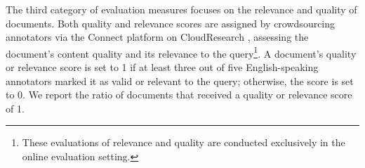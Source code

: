  The third category of evaluation measures focuses on the relevance and quality of documents. Both quality and relevance scores are assigned by crowdsourcing annotators via the Connect platform on CloudResearch \cite{noauthor_introducing_2024}, assessing the document's content quality and its relevance to the query\footnote{These evaluations of relevance and quality are conducted exclusively in the online evaluation setting.}. A document's quality or relevance score is set to 1 if at least three out of five English-speaking annotators marked it as valid or relevant to the query; otherwise, the score is set to 0. We report the ratio of documents that received a quality or relevance score of 1.



